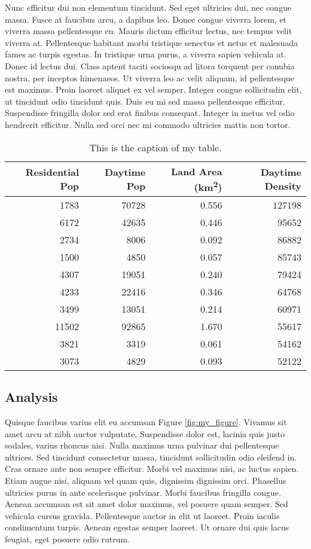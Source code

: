 \documentclass[12pt,letterpaper]{article} %
\begin{document}
	Nunc efficitur dui non elementum tincidunt. Sed eget ultricies dui, nec congue massa. Fusce at faucibus arcu, a dapibus leo. Donec congue viverra lorem, et viverra massa pellentesque eu. Mauris dictum efficitur lectus, nec tempus velit viverra at. Pellentesque habitant morbi tristique senectus et netus et malesuada fames ac turpis egestas. In tristique urna purus, a viverra sapien vehicula at. Donec id lectus dui. Class aptent taciti sociosqu ad litora torquent per conubia nostra, per inceptos himenaeos. Ut viverra leo ac velit aliquam, id pellentesque est maximus. Proin laoreet aliquet ex vel semper. Integer congue sollicitudin elit, ut tincidunt odio tincidunt quis. Duis eu mi sed massa pellentesque efficitur. Suspendisse fringilla dolor sed erat finibus consequat. Integer in metus vel odio hendrerit efficitur. Nulla sed orci nec mi commodo ultricies mattis non tortor.
	
	\begin{table*}[tbp]
		\centering
		\caption{This is the caption of my table.}
		\label{tab:my_table}
		\begin{tabular}{rrrr}
			\toprule
			Residential Pop &  Daytime Pop &  Land Area (km\textsuperscript{2}) &  Daytime Density \\
			\midrule
			1783  & 70728 & 0.556 & 127198 \\
			6172  & 42635 & 0.446 &  95652 \\
			2734  &  8006 & 0.092 &  86882 \\
			1500  &  4850 & 0.057 &  85743 \\
			4307  & 19051 & 0.240 &  79424 \\
			4233  & 22416 & 0.346 &  64768 \\
			3499  & 13051 & 0.214 &  60971 \\
			11502 & 92865 & 1.670 &  55617 \\
			3821  &  3319 & 0.061 &  54162 \\
			3073  &  4829 & 0.093 &  52122 \\
			\bottomrule
		\end{tabular}
	\end{table*}
	
	\subsection*{Analysis}
	Quisque faucibus varius elit eu accumsan Figure \ref{fig:my_figure}. Vivamus sit amet arcu at nibh auctor vulputate. Suspendisse dolor est, lacinia quis justo sodales, varius rhoncus nisi. Nulla maximus urna pulvinar dui pellentesque ultrices. Sed tincidunt consectetur massa, tincidunt sollicitudin odio eleifend in. Cras ornare ante non semper efficitur. Morbi vel maximus nisi, ac luctus sapien. Etiam augue nisi, aliquam vel quam quis, dignissim dignissim orci. Phasellus ultricies purus in ante scelerisque pulvinar. Morbi faucibus fringilla congue. Aenean accumsan est sit amet dolor maximus, vel posuere quam semper. Sed vehicula cursus gravida. Pellentesque auctor in elit ut laoreet. Proin iaculis condimentum turpis. Aenean egestas semper laoreet. Ut ornare dui quis lacus feugiat, eget posuere odio rutrum.
	
\end{document}
